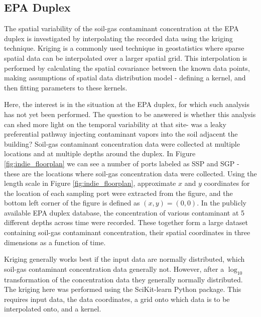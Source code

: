 \subsection{EPA Duplex}

The spatial variability of the soil-gas contaminant concentration at the EPA duplex is investigated by interpolating the recorded data using the kriging technique.
Kriging is a commonly used technique in geostatistics where sparse spatial data can be interpolated over a larger spatial grid.
This interpolation is performed by calculating the spatial covariance between the known data points, making assumptions of spatial data distribution model - defining a kernel, and then fitting parameters to these kernels\cite{williams_prediction_1998}.\par

Here, the interest is in the situation at the EPA duplex, for which such analysis has not yet been performed.
The question to be answered is whether this analysis can shed more light on the temporal variability at that site- was a leaky preferential pathway injecting contaminant vapors into the soil adjacent the building?
Soil-gas contaminant concentration data were collected at multiple locations and at multiple depths around the duplex.
In Figure \ref{fig:indie_floorplan} we can see a number of ports labeled as SSP and SGP - these are the locations where soil-gas concentration data were collected.
Using the length scale in Figure \ref{fig:indie_floorplan}, approximate $x$ and $y$ coordinates for the location of each sampling port were extracted from the figure, and the bottom left corner of the figure is defined as $(x, y) = (0,0)$.
In the publicly available EPA duplex database\cite{noauthor_indianapolis_nodate}, the concentration of various contaminant at 5 different depths across time were recorded.
These together form a large dataset containing soil-gas contaminant concentration, their spatial coordinates in three dimensions as a function of time.\par

Kriging generally works best if the input data are normally distributed, which soil-gas contaminant concentration data generally not.
However, after a $\log_{10}$ transformation of the concentration data they generally normally distributed.
The kriging here was performed using the SciKit-learn Python package\cite{pedregosa_scikit-learn_2011}.
This requires input data, the data coordinates, a grid onto which data is to be interpolated onto, and a kernel.\par

